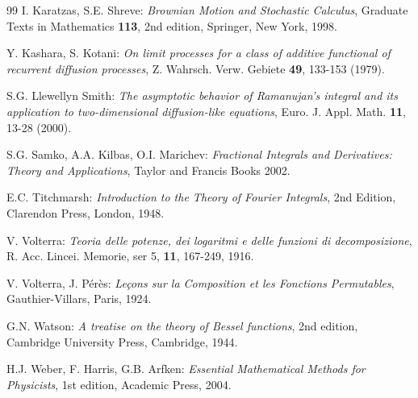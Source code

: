 \documentclass[10pt]{article}
\numberwithin{equation}{section}
\theoremstyle{definition}
\begin{document}
\begin{thebibliography}{99}
 I. Karatzas, S.E. Shreve: \emph{Brownian Motion and Stochastic Calculus}, Graduate Texts in Mathematics \textbf{113}, 2nd edition, Springer, New York, 1998.


 Y. Kashara, S. Kotani: \emph{On limit processes for a class of additive functional of recurrent diffusion processes}, Z. Wahrsch. Verw. Gebiete \textbf{49}, 133-153 (1979).




   S.G.  Llewellyn Smith: \emph{The asymptotic behavior of Ramanujan's integral and its application to two-dimensional diffusion-like equations}, Euro. J.  Appl. Math. \textbf{11}, 13-28 (2000).






 S.G. Samko, A.A. Kilbas, O.I. Marichev: \emph{Fractional Integrals and Derivatives: Theory and Applications}, Taylor and Francis Books 2002. 


   E.C. Titchmarsh: \emph{Introduction to the Theory of Fourier Integrals}, 2nd Edition, Clarendon Press, London, 1948.



 V. Volterra: \emph{Teoria delle potenze, dei logaritmi e delle funzioni di decomposizione}, R. Acc. Lincei. Memorie, ser 5, \textbf{11}, 167-249, 1916.




 V. Volterra, J. P\'er\`es: \emph{Le\c{c}ons sur la Composition et les Fonctions Permutables},  Gauthier-Villars, Paris, 1924.



 G.N. Watson: \emph{A treatise on the theory of Bessel functions}, 2nd edition,  Cambridge University Press, Cambridge, 1944.




 H.J. Weber, F. Harris, G.B. Arfken: \emph{Essential Mathematical Methods for Physicists}, 1st edition,  Academic Press, 2004.




\end{thebibliography}
\end{document}
